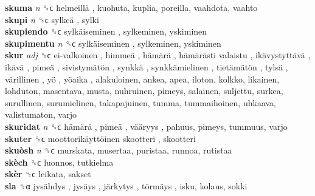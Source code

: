 \textbf{skuma} \emph{n}  ␝ϲ   helmeillä , kuohuta, kuplia, poreilla, vaahdota, vaahto  \\
\textbf{skupi} \emph{n}  ␝ϲ   sylkeä , sylki  \\
\textbf{skupiendo} ␝ϲ   sylkäiseminen , sylkeminen, yskiminen  \\
\textbf{skupimentu} \emph{n}  ␝ϲ   sylkäiseminen , sylkeminen, yskiminen  \\
\textbf{skur} \emph{adj}  ␝ϲ   ei-valkoinen ,  himmeä ,  hämärä ,  hämärästi valaistu ,  ikävystyttävä ,  ikävä ,  pimeä ,  sivistymätön ,  synkkä ,  synkkämielinen ,  tietämätön ,  tylsä ,  värillinen ,  yö ,  yöaika , alakuloinen, ankea, apea, iloton, kolkko, likainen, lohduton, masentava, musta, nuhruinen, pimeys, salainen, suljettu, surkea, surullinen, surumielinen, takapajuinen, tumma, tummaihoinen, uhkaava, valistumaton, varjo  \\
\textbf{skuridat} \emph{n}  ␝ϲ   hämärä ,  pimeä ,  vääryys , pahuus, pimeys, tummuus, varjo  \\
\textbf{skuter} ␝ϲ   moottorikäyttöinen skootteri , skootteri  \\
\textbf{skuòsh} \emph{n}  ␝ϲ  murskata, musertaa, puristaa, runnoa, rutistaa  \\
\textbf{skèch} ␝ϲ  luonnos, tutkielma  \\
\textbf{skèr} ␝ϲ  leikata, sakset  \\
\textbf{sla} ␝α   jysähdys ,  jysäys ,  järkytys ,  törmäys , isku, kolaus, sokki  \\
